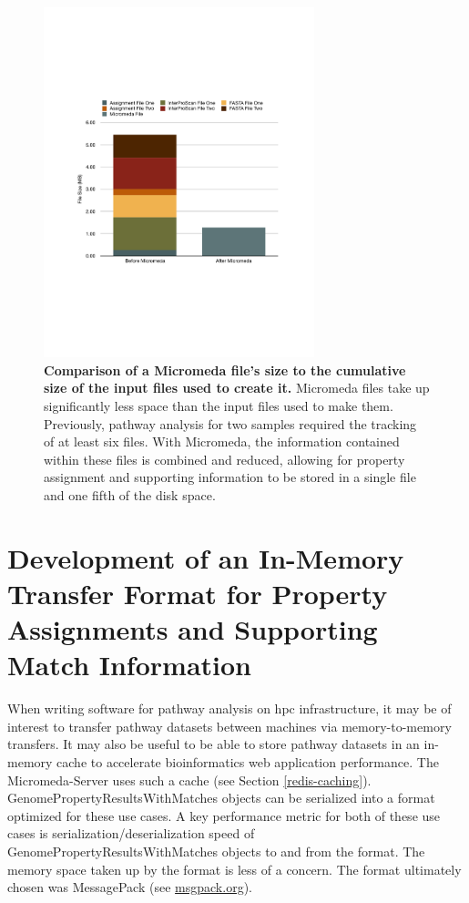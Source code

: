 \begin{figure}[!ht]
  \centering
	\includegraphics[width=0.70\textwidth]{media/micromeda_file_size.pdf}
	 \caption[Comparison of a Micromeda file's size to the cumulative size of the 
input files used to create it.]{\textbf{Comparison of a Micromeda file's size to 
the cumulative size of the input files used to create it.} Micromeda files take 
up significantly less space than the input files used to make them. Previously, 
pathway analysis for two samples required the tracking of at least six files. 
With Micromeda, the information contained within these files is combined and 
reduced, allowing for property assignment and supporting information to be 
stored in a single file and one fifth of the disk space.}
	 \label{fig:micromedafilesize}
\end{figure}

\section{Development of an In-Memory Transfer Format for Property Assignments 
and Supporting Match Information} \label{msgpack}

When writing software for pathway analysis on \gls{hpc} infrastructure, it may 
be of interest to transfer pathway datasets between machines via 
memory-to-memory transfers. It may also be useful to be able to store pathway 
datasets in an in-memory cache to accelerate bioinformatics web application 
performance. The Micromeda-Server uses such a cache (see Section 
\ref{redis-caching}). GenomePropertyResultsWithMatches objects can be serialized 
into a format optimized for these use cases. A key performance metric for both 
of these use cases is serialization/deserialization speed of 
GenomePropertyResultsWithMatches objects to and from the format. The memory 
space taken up by the format is less of a concern. The format ultimately chosen 
was MessagePack  \cite{furuhashi2013messagepack}(see 
\href{http://msgpack.org}{msgpack.org}).

